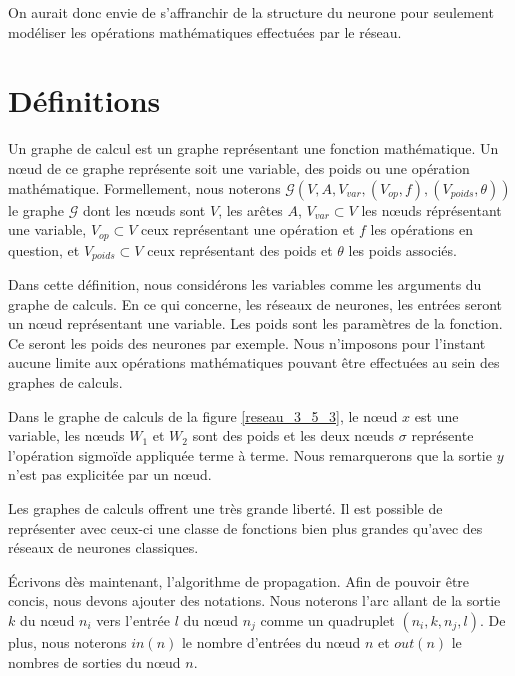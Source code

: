 On aurait donc envie de s'affranchir de la structure du neurone pour seulement modéliser les opérations mathématiques effectuées par le réseau.

\section{Définitions}

\begin{definition}
Un graphe de calcul est un graphe représentant une fonction mathématique. Un n\oe{}ud de ce graphe représente soit une variable, des poids ou une opération mathématique. Formellement, nous noterons $\mathcal{G}(V, A, V_{var}, (V_{op}, f), (V_{poids}, \theta))$ le graphe $\mathcal{G}$ dont les n\oe{}uds sont $V$, les arêtes $A$, $V_{var} \subset V$ les n\oe{}uds réprésentant une variable, $V_{op} \subset V$ ceux représentant une opération et $f$ les opérations en question, et $V_{poids} \subset V$ ceux représentant des poids et $\theta$ les poids associés.
\end{definition}

Dans cette définition, nous considérons les variables comme les arguments du graphe de calculs. En ce qui concerne, les réseaux de neurones, les entrées seront un n\oe{}ud représentant une variable. Les poids sont les paramètres de la fonction. Ce seront les poids des neurones par exemple. Nous n'imposons pour l'instant aucune limite aux opérations mathématiques pouvant être effectuées au sein des graphes de calculs.

Dans le graphe de calculs de la figure \ref{reseau_3_5_3}, le n\oe{}ud $x$ est une variable, les n\oe{}uds $W_1$ et $W_2$ sont des poids et les deux n\oe{}uds $\sigma$ représente l'opération sigmoïde appliquée terme à terme. Nous remarquerons que la sortie $y$ n'est pas explicitée par un n\oe{}ud. 

Les graphes de calculs offrent une très grande liberté. Il est possible de représenter avec ceux-ci une classe de fonctions bien plus grandes qu'avec des réseaux de neurones classiques.

Écrivons dès maintenant, l'algorithme de propagation. Afin de pouvoir être concis, nous devons ajouter des notations. Nous noterons l'arc allant de la sortie $k$ du n\oe{}ud $n_i$ vers l'entrée $l$ du n\oe{}ud $n_j$ comme un quadruplet $(n_i, k, n_j, l)$. De plus, nous noterons $in(n)$ le nombre d'entrées du n\oe{}ud $n$ et $out(n)$ le nombres de sorties du n\oe{}ud $n$.

